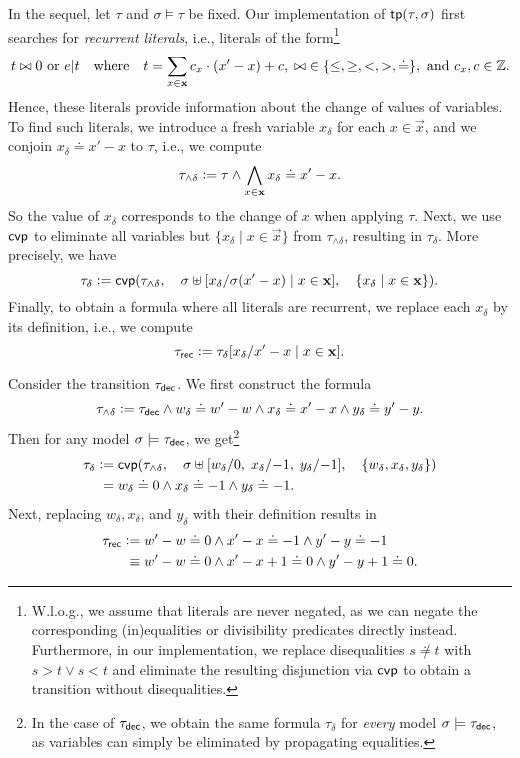 In the sequel, let $\tau$ and $\sigma \models \tau$ be fixed.
%
Our implementation of $\mathsf{tp}(\tau,\sigma)$ first searches for \emph{recurrent literals}, i.e., literals of the form\footnote{W.l.o.g., we assume that literals are never negated, as we can negate the corresponding (in)equalities or divisibility predicates directly instead.
  Furthermore, in our implementation, we replace disequalities $s \not\doteq t$ with $s >
  t \lor s < t$ and eliminate the resulting disjunction via $\mathsf{cvp}$ to obtain a transition
  without disequalities.}
\[
  t \bowtie 0 \text{ or } e|t \quad \text{where} \quad t = \sum_{x \in \bm{\mathrm{x}}} c_x
  \cdot (x'-x) + c, \; {\bowtie} \in \{\leq,\geq,<,>,\doteq\},
  \text{ and } c_x,c \in \mathbb{Z}.
\]
Hence, these literals provide information about the change of values of variables.
%
To find such literals, we introduce a fresh variable $x_\delta$ for each $x \in \vec{x}$, and we conjoin $x_\delta \doteq x' - x$ to $\tau$, i.e., we compute
\[
  \tau_{\land \delta} \mathrel{\mathop:}= \tau \land \bigwedge_{x \in \bm{\mathrm{x}}} x_\delta \doteq x' - x.
\]
%
So the value of $x_\delta$ corresponds to the change of $x$ when applying $\tau$.
%
Next, we use $\mathsf{cvp}$ to eliminate all variables but $\{x_\delta \mid x \in \vec{x}\}$ from $\tau_{\land\delta}$, resulting in $\tau_\delta$.
%
More precisely, we have
\[
  \tau_\delta \mathrel{\mathop:}= \mathsf{cvp}(\tau_{\land \delta}, \quad \sigma \uplus [x_\delta/\sigma(x'-x) \mid x \in \bm{\mathrm{x}}], \quad \{x_\delta \mid x \in \bm{\mathrm{x}}\}).
\]
Finally, to obtain a formula where all literals are recurrent, we replace each $x_\delta$ by its definition, i.e., we compute
\[
  \tau_{\mathsf{rec}} \mathrel{\mathop:}= \tau_\delta[x_\delta / x' - x \mid x \in \bm{\mathrm{x}}].
\]
%
\begin{example}
  \label{ex:finding-rec}
  Consider the transition $\tau_{\mathsf{dec}}$.
  We first construct the formula
  \[
    \tau_{\land \delta} \mathrel{\mathop:}= \tau_{\mathsf{dec}} \land w_\delta \doteq w' - w \land x_\delta \doteq x' - x \land y_\delta \doteq y' - y.
  \]
  Then for any model $\sigma \models \tau_{\mathsf{dec}}$, we get\footnote{In the case of $\tau_{\mathsf{dec}}$, we obtain the same formula $\tau_\delta$ for \emph{every} model $\sigma \models \tau_{\mathsf{dec}}$, as variables can simply be eliminated by propagating equalities.}
  \begin{align*}
    \tau_\delta \mathrel{\mathop:}= {} & \mathsf{cvp}(\tau_{\land \delta}, \quad \sigma \uplus [w_\delta/0, \; x_\delta/{-}1, \; y_\delta/{-}1], \quad \{w_\delta, x_\delta, y_\delta\}) \\
                {} = {} & w_\delta \doteq 0 \land x_\delta \doteq -1 \land y_\delta \doteq -1.
  \end{align*}
  Next, replacing $w_\delta,x_\delta$, and $y_\delta$ with their definition results in
  \begin{align*}
    \tau_{\mathsf{rec}} \mathrel{\mathop:}= {} & w' - w \doteq 0 \land x' - x \doteq -1 \land y' - y \doteq -1        \\
    \equiv {}         & w' - w \doteq 0 \land x' - x + 1 \doteq 0 \land y' - y + 1 \doteq 0.
  \end{align*}
\end{example}
